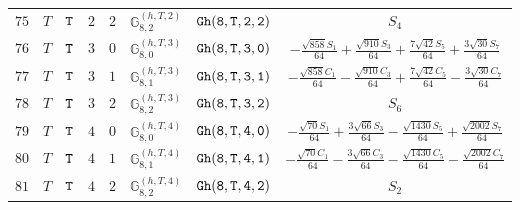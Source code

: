 \documentclass[fleqn,8pt]{jsarticle}
\begin{document}
\begin{table}[ht!]
\begin{center}
\begin{tabular}{cccccccc}
$ 75 $ & $ T $ & $ {\tt T} $ & $ 2 $ & $ 2 $ & $ \mathbb{G}_{8,2}^{(h,T,2)} $ & $ {\tt Gh(8,T,2,2)} $ & $ S_{4} $ \\
$ 76 $ & $ T $ & $ {\tt T} $ & $ 3 $ & $ 0 $ & $ \mathbb{G}_{8,0}^{(h,T,3)} $ & $ {\tt Gh(8,T,3,0)} $ & $ - \frac{\sqrt{858} S_{1}}{64} + \frac{\sqrt{910} S_{3}}{64} + \frac{7 \sqrt{42} S_{5}}{64} + \frac{3 \sqrt{30} S_{7}}{64} $ \\
$ 77 $ & $ T $ & $ {\tt T} $ & $ 3 $ & $ 1 $ & $ \mathbb{G}_{8,1}^{(h,T,3)} $ & $ {\tt Gh(8,T,3,1)} $ & $ - \frac{\sqrt{858} C_{1}}{64} - \frac{\sqrt{910} C_{3}}{64} + \frac{7 \sqrt{42} C_{5}}{64} - \frac{3 \sqrt{30} C_{7}}{64} $ \\
$ 78 $ & $ T $ & $ {\tt T} $ & $ 3 $ & $ 2 $ & $ \mathbb{G}_{8,2}^{(h,T,3)} $ & $ {\tt Gh(8,T,3,2)} $ & $ S_{6} $ \\
$ 79 $ & $ T $ & $ {\tt T} $ & $ 4 $ & $ 0 $ & $ \mathbb{G}_{8,0}^{(h,T,4)} $ & $ {\tt Gh(8,T,4,0)} $ & $ - \frac{\sqrt{70} S_{1}}{64} + \frac{3 \sqrt{66} S_{3}}{64} - \frac{\sqrt{1430} S_{5}}{64} + \frac{\sqrt{2002} S_{7}}{64} $ \\
$ 80 $ & $ T $ & $ {\tt T} $ & $ 4 $ & $ 1 $ & $ \mathbb{G}_{8,1}^{(h,T,4)} $ & $ {\tt Gh(8,T,4,1)} $ & $ - \frac{\sqrt{70} C_{1}}{64} - \frac{3 \sqrt{66} C_{3}}{64} - \frac{\sqrt{1430} C_{5}}{64} - \frac{\sqrt{2002} C_{7}}{64} $ \\
$ 81 $ & $ T $ & $ {\tt T} $ & $ 4 $ & $ 2 $ & $ \mathbb{G}_{8,2}^{(h,T,4)} $ & $ {\tt Gh(8,T,4,2)} $ & $ S_{2} $ \\
 \hline \hline
\end{tabular}
\end{center}
\end{table}
\end{document}
